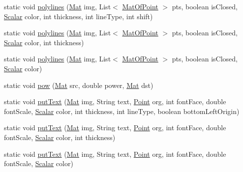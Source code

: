 \begin{DoxyCompactItemize}
static void \mbox{\hyperlink{classorg_1_1opencv_1_1core_1_1_core_ad24a7743adf154594355229a6c0a19cd}{polylines}} (\mbox{\hyperlink{classorg_1_1opencv_1_1core_1_1_mat}{Mat}} img, List$<$ \mbox{\hyperlink{classorg_1_1opencv_1_1core_1_1_mat_of_point}{Mat\+Of\+Point}} $>$ pts, boolean is\+Closed, \mbox{\hyperlink{classorg_1_1opencv_1_1core_1_1_scalar}{Scalar}} color, int thickness, int line\+Type, int shift)
\item 
static void \mbox{\hyperlink{classorg_1_1opencv_1_1core_1_1_core_a377faf881106086b38611168440c5321}{polylines}} (\mbox{\hyperlink{classorg_1_1opencv_1_1core_1_1_mat}{Mat}} img, List$<$ \mbox{\hyperlink{classorg_1_1opencv_1_1core_1_1_mat_of_point}{Mat\+Of\+Point}} $>$ pts, boolean is\+Closed, \mbox{\hyperlink{classorg_1_1opencv_1_1core_1_1_scalar}{Scalar}} color, int thickness)
\item 
static void \mbox{\hyperlink{classorg_1_1opencv_1_1core_1_1_core_a1f9634590e755ea36ed3e5bdc7245811}{polylines}} (\mbox{\hyperlink{classorg_1_1opencv_1_1core_1_1_mat}{Mat}} img, List$<$ \mbox{\hyperlink{classorg_1_1opencv_1_1core_1_1_mat_of_point}{Mat\+Of\+Point}} $>$ pts, boolean is\+Closed, \mbox{\hyperlink{classorg_1_1opencv_1_1core_1_1_scalar}{Scalar}} color)
\item 
static void \mbox{\hyperlink{classorg_1_1opencv_1_1core_1_1_core_a29c20af97ae09c75246777774bc6d41b}{pow}} (\mbox{\hyperlink{classorg_1_1opencv_1_1core_1_1_mat}{Mat}} src, double power, \mbox{\hyperlink{classorg_1_1opencv_1_1core_1_1_mat}{Mat}} dst)
\item 
static void \mbox{\hyperlink{classorg_1_1opencv_1_1core_1_1_core_a83cb8f8058aead15a4f9995328aef154}{put\+Text}} (\mbox{\hyperlink{classorg_1_1opencv_1_1core_1_1_mat}{Mat}} img, String text, \mbox{\hyperlink{classorg_1_1opencv_1_1core_1_1_point}{Point}} org, int font\+Face, double font\+Scale, \mbox{\hyperlink{classorg_1_1opencv_1_1core_1_1_scalar}{Scalar}} color, int thickness, int line\+Type, boolean bottom\+Left\+Origin)
\item 
static void \mbox{\hyperlink{classorg_1_1opencv_1_1core_1_1_core_a1a575810e5c02ecba186388a77e6af94}{put\+Text}} (\mbox{\hyperlink{classorg_1_1opencv_1_1core_1_1_mat}{Mat}} img, String text, \mbox{\hyperlink{classorg_1_1opencv_1_1core_1_1_point}{Point}} org, int font\+Face, double font\+Scale, \mbox{\hyperlink{classorg_1_1opencv_1_1core_1_1_scalar}{Scalar}} color, int thickness)
\item 
static void \mbox{\hyperlink{classorg_1_1opencv_1_1core_1_1_core_acd34e2234dab5c2eb2f8f2c517bf9f2a}{put\+Text}} (\mbox{\hyperlink{classorg_1_1opencv_1_1core_1_1_mat}{Mat}} img, String text, \mbox{\hyperlink{classorg_1_1opencv_1_1core_1_1_point}{Point}} org, int font\+Face, double font\+Scale, \mbox{\hyperlink{classorg_1_1opencv_1_1core_1_1_scalar}{Scalar}} color)

\end{DoxyCompactItemize}
